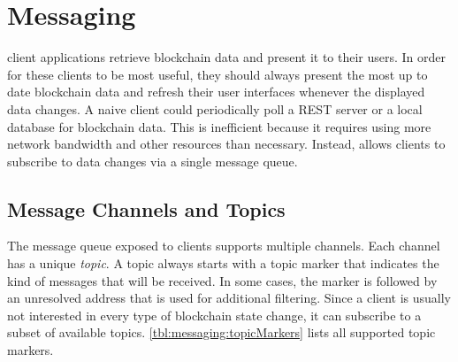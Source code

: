 \section{Messaging}
\label{sec:messaging}

\newcommand{\messagefield}[3]{
	\draw[] (0, #3 + 0.25) node[label=left:\small{#1}]{};
	\draw[draw=black] (0, #3) rectangle (4, #3 + 0.5);
	\draw[] (2, #3 + 0.25) node[label=center:\small{#2}]{};
}


 client applications retrieve blockchain data and present it to their users.
In order for these clients to be most useful, they should always present the most up to date blockchain data and refresh their user interfaces whenever the displayed data changes.
A naive client could periodically poll a REST server or a local database for blockchain data.
This is inefficient because it requires using more network bandwidth and other resources than necessary.
Instead, \codenamespace allows clients to subscribe to data changes via a single message queue.

\subsection{Message Channels and Topics}
\label{sec:messaging:channels}

The \codenamespace message queue exposed to clients supports multiple channels.
Each channel has a unique \emph{topic}.
A topic always starts with a topic marker that indicates the kind of messages that will be received.
In some cases, the marker is followed by an unresolved address that is used for additional filtering.
Since a client is usually not interested in every type of blockchain state change, it can subscribe to a subset of available topics.
\autoref{tbl:messaging:topicMarkers} lists all supported topic markers.

\begin{figure}[H]
	\label{tbl:messaging:topicMarkers}
\end{figure}

